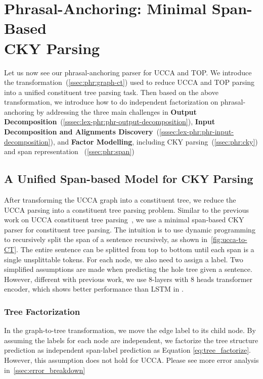 \section[Phrasal-Anchoring: Minimal Span-based CKY Parsing]{Phrasal-Anchoring: Minimal Span-Based \\CKY Parsing}
\label{sec:lex-phr:cky-based}

Let us now see our phrasal-anchoring parser for UCCA and TOP. We
introduce the transformation~(\autoref{ssec:phr:graph-ct}) used to
reduce UCCA and TOP parsing into a unified constituent tree parsing
task. Then based on the above transformation, we introduce how to do
independent factorization on phrasal-anchoring by addressing the three
main challenges in \textbf{Output
  Decomposition}~(\autoref{sssec:lex-phr:phr-output-decomposition}),
\textbf{Input Decomposition and Alignments
  Discovery}~(\autoref{sssec:lex-phr:phr-input-decomposition}), and
\textbf{Factor Modelling}, including CKY
parsing~(\autoref{ssec:phr:cky}) and span representation
~(\autoref{ssec:phr:span})





\subsection{A Unified Span-based Model for CKY Parsing}
\label{ssec:phr:cky}
After transforming the UCCA graph into a constituent tree, we reduce
the UCCA parsing into a constituent tree parsing problem. Similar to
the previous work on UCCA constituent tree
parsing~\cite{jiang2019hlt}, we use a minimal span-based CKY parser
for constituent tree parsing.  The intuition is to use dynamic
programming to recursively split the span of a sentence recursively,
as shown in~\autoref{fig:ucca-to-CT}. The entire sentence can be
splitted from top to bottom until each span is a single unsplittable
tokens. For each node, we also need to assign a label. Two simplified
assumptions are made when predicting the hole tree given a
sentence. However, different with previous work, we use 8-layers with
8 heads transformer encoder, which shows better performance than LSTM
in \citet{kitaev2018constituency}.

\subsubsection{Tree Factorization}
\label{sssec:phr:tree-factorization}
In the graph-to-tree transformation, we move the edge label to its
child node. By assuming the labels for each node are independent, we
factorize the tree structure prediction as independent span-label
prediction as Equation \ref{eq:tree_factorize}. However, this
assumption does not hold for UCCA.  Please see more error analysis
in~\autoref{ssec:error_breakdown}

